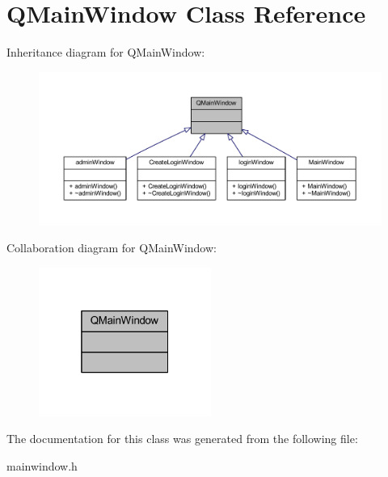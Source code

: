 \hypertarget{class_q_main_window}{}\section{Q\+Main\+Window Class Reference}
\label{class_q_main_window}


Inheritance diagram for Q\+Main\+Window\+:\nopagebreak
\begin{figure}[H]
\begin{center}
\leavevmode
\includegraphics[width=350pt]{class_q_main_window__inherit__graph}
\end{center}
\end{figure}


Collaboration diagram for Q\+Main\+Window\+:\nopagebreak
\begin{figure}[H]
\begin{center}
\leavevmode
\includegraphics[width=160pt]{class_q_main_window__coll__graph}
\end{center}
\end{figure}


The documentation for this class was generated from the following file\+:\begin{DoxyCompactItemize}
\item 
mainwindow.\+h\end{DoxyCompactItemize}
